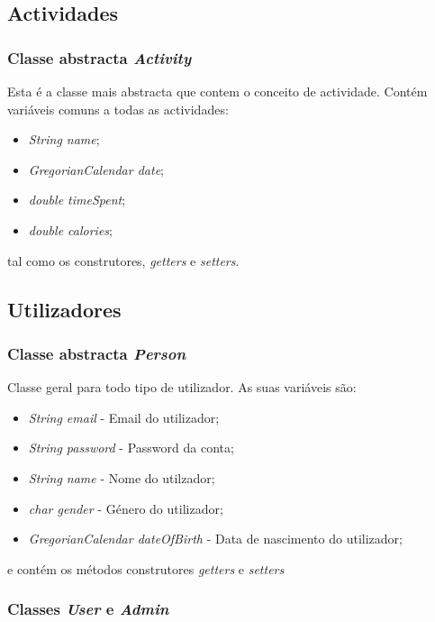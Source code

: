 \documentclass[10pt,notitlepage]{article}
\begin{document}
\subsection{Actividades}
\subsubsection{Classe abstracta \textit{Activity}}

Esta é a classe mais abstracta que contem o conceito de actividade. Contém variáveis comuns a todas as actividades:
\begin{itemize}
\item \textit{String name};
\item \textit{GregorianCalendar date};
\item \textit{double timeSpent};
\item \textit{double calories};
\end{itemize}
tal como os construtores, \textit{getters} e \textit{setters}.






\subsection{Utilizadores}
\subsubsection{Classe abstracta \textit{Person}}
Classe geral para todo tipo de utilizador. As suas variáveis são:
\begin{itemize}
\item \textit{String email} - Email do utilizador;
\item \textit{String password} - Password da conta;
\item \textit{String name} - Nome do utilzador;
\item \textit{char gender} - Género do utilizador;
\item \textit{GregorianCalendar dateOfBirth} - Data de nascimento do utilizador;
\end{itemize}
e contém os métodos construtores \textit{getters} e \textit{setters}

\subsubsection{Classes \textit{User} e \textit{Admin}}
\end{document}
